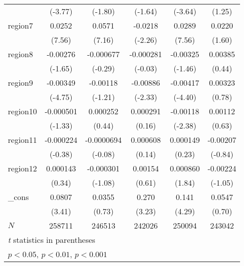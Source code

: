 \begin{table}[htbp]
\begin{tabular}{l*{5}{c}}
            &     (-3.77)         &     (-1.80)         &     (-1.64)         &     (-3.64)         &      (1.25)         \\
region7     &      0.0252\sym{***}&      0.0571\sym{***}&     -0.0218\sym{*}  &      0.0289\sym{***}&      0.0220         \\
            &      (7.56)         &      (7.16)         &     (-2.26)         &      (7.56)         &      (1.60)         \\
region8     &    -0.00276         &   -0.000677         &   -0.000281         &    -0.00325         &     0.00385         \\
            &     (-1.65)         &     (-0.29)         &     (-0.03)         &     (-1.46)         &      (0.44)         \\
region9     &    -0.00349\sym{***}&    -0.00118         &    -0.00886\sym{*}  &    -0.00417\sym{***}&     0.00323         \\
            &     (-4.75)         &     (-1.21)         &     (-2.33)         &     (-4.40)         &      (0.78)         \\
region10    &   -0.000501         &    0.000252         &    0.000291         &    -0.00118\sym{*}  &     0.00112         \\
            &     (-1.33)         &      (0.44)         &      (0.16)         &     (-2.38)         &      (0.63)         \\
region11    &   -0.000224         &  -0.0000694         &    0.000608         &    0.000149         &    -0.00207         \\
            &     (-0.38)         &     (-0.08)         &      (0.14)         &      (0.23)         &     (-0.84)         \\
region12    &    0.000143         &   -0.000301         &     0.00154         &    0.000860         &    -0.00224         \\
            &      (0.34)         &     (-1.08)         &      (0.61)         &      (1.84)         &     (-1.05)         \\
\_cons      &      0.0807\sym{***}&      0.0355         &       0.270\sym{**} &       0.141\sym{***}&      0.0547         \\
            &      (3.41)         &      (0.73)         &      (3.23)         &      (4.29)         &      (0.70)         \\
\hline
\(N\)       &      258711         &      246513         &      242026         &      250094         &      243042         \\
\hline\hline
\multicolumn{6}{l}{\footnotesize \textit{t} statistics in parentheses}\\
\multicolumn{6}{l}{\footnotesize \sym{*} \(p<0.05\), \sym{**} \(p<0.01\), \sym{***} \(p<0.001\)}\\
\end{tabular}
\label{tab:oaxaca_female_clustered}
\end{table}
